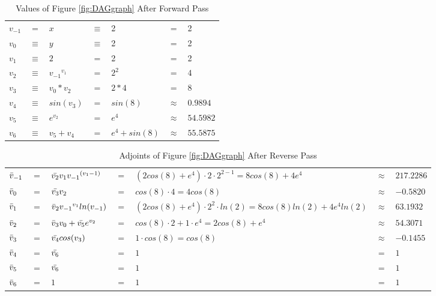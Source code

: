 \documentclass{article}
\begin{document}
\begin{table}[h!]
    \centering
    \begin{tabular}{|lclllcl|}
        \hline
        $v_{-1}$ & $=$ & $x$ & $\equiv$ & 2 & $=$ & 2\\
        $v_{0}$ & $\equiv$ & $y$ & $\equiv$ & 2 & $=$ & 2\\
        \hline
        $v_{1}$ & $\equiv$ & $2$ & $=$ & 2 & $=$ & 2\\
        $v_{2}$ & $\equiv$ & ${v_{-1}}^{v_{1}}$ & $=$ & $ 2^2$ & $=$ & $4$\\
        $v_{3}$ & $\equiv$ & $v_0 * v_2$ & $=$ & $ 2 * 4$ & $=$ & $8$\\
        $v_{4}$ & $\equiv$ & $sin(v_3)$ & $=$ & $sin(8)$ & $\approx$ & $0.9894$\\
        $v_{5}$ & $\equiv$ & $e^{v_2}$ & $=$ & $ e^4$ & $\approx$ & $54.5982$\\
        \hline
        $v_{6}$ & $\equiv$ & $v_5 + v_4$ & $=$ & $e^4 + sin(8)$ & $\approx$ & $55.5875$\\
        \hline
    \end{tabular}
    \caption{Values of Figure \ref{fig:DAGgraph} After Forward Pass}
    \label{tab:example1FP}
\end{table}


\begin{table}[h!]
    \centering
    \begin{tabular}{|lclllll|}
        \hline
        $\Bar{v}_{-1}$ & $=$ & $\Bar{v_2}v_1 {v_{-1}}^{(v_{1}-1)}$ & $=$ & $(2cos(8)+e^4) \cdot 2 \cdot 2^{2-1} = 8cos(8)+4e^4$ & $\approx$ & $217.2286$\\
        $\Bar{v}_{0}$ & $=$ & $\Bar{v_3}v_2$ & $=$ & $cos(8)\cdot4 = 4cos(8)$ & $\approx$ & $-0.5820$\\
        \hline
        $\Bar{v}_{1}$ & $=$ & $\Bar{v}_{2}{v_{-1}}^{v_{1}}ln(v_{-1})$ & $=$ & $(2cos(8)+e^4) \cdot 2^2 \cdot ln(2) = 8cos(8)ln(2) +4e^4ln(2)$ & $\approx$ & $63.1932$\\
        $\Bar{v}_{2}$ & $=$ & $\Bar{v}_{3}v_0 + \Bar{v_5}e^{v_2}$ & $=$ & $cos(8) \cdot 2 + 1 \cdot e^{4} = 2cos(8)+e^4$ & $\approx$ & $54.3071$\\
        $\Bar{v}_{3}$ & $=$ & $\Bar{v_4}cos(v_3)$ & $=$ & $1 \cdot cos(8) = cos(8)$ & $\approx$ & $-0.1455$\\
        $\Bar{v}_{4}$ & $=$ & $\Bar{v_6}$ & $=$ & $1$ & $=$ & $1$\\
        $\Bar{v}_{5}$ & $=$ & $\Bar{v_6}$ & $=$ & $1$ & $=$ & $1$\\
        \hline
        $\Bar{v}_{6}$ & $=$ & $1$ & $=$ & $1$ & $=$ & $1$\\
        \hline
    \end{tabular}
    \caption{Adjoints of Figure \ref{fig:DAGgraph} After Reverse Pass}
    \label{tab:example1RP}
\end{table}
\end{document}
